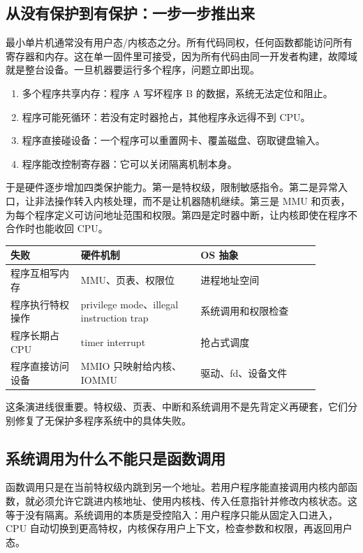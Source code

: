 \subsection{从没有保护到有保护：一步一步推出来}

最小单片机通常没有用户态/内核态之分。所有代码同权，任何函数都能访问所有寄存器和内存。这在单一固件里可接受，因为所有代码由同一开发者构建，故障域就是整台设备。一旦机器要运行多个程序，问题立即出现。

\begin{enumerate}
\tightlist
\item 多个程序共享内存：程序 A 写坏程序 B 的数据，系统无法定位和阻止。
\item 程序可能死循环：若没有定时器抢占，其他程序永远得不到 CPU。
\item 程序直接碰设备：一个程序可以重置网卡、覆盖磁盘、窃取键盘输入。
\item 程序能改控制寄存器：它可以关闭隔离机制本身。
\end{enumerate}

于是硬件逐步增加四类保护能力。第一是特权级，限制敏感指令。第二是异常入口，让非法操作转入内核处理，而不是让机器随机继续。第三是 MMU 和页表，为每个程序定义可访问地址范围和权限。第四是定时器中断，让内核即使在程序不合作时也能收回 CPU。

\begin{longtable}{p{0.2\linewidth}p{0.34\linewidth}p{0.34\linewidth}}
\toprule
失败 & 硬件机制 & OS 抽象 \\
\midrule
程序互相写内存 & MMU、页表、权限位 & 进程地址空间 \\
程序执行特权操作 & privilege mode、illegal instruction trap & 系统调用和权限检查 \\
程序长期占 CPU & timer interrupt & 抢占式调度 \\
程序直接访问设备 & MMIO 只映射给内核、IOMMU & 驱动、fd、设备文件 \\
\bottomrule
\end{longtable}

这条演进线很重要。特权级、页表、中断和系统调用不是先背定义再硬套，它们分别修复了无保护多程序系统中的具体失败。

\subsection{系统调用为什么不能只是函数调用}

函数调用只是在当前特权级内跳到另一个地址。若用户程序能直接调用内核内部函数，就必须允许它跳进内核地址、使用内核栈、传入任意指针并修改内核状态。这等于没有隔离。系统调用的本质是受控陷入：用户程序只能从固定入口进入，CPU 自动切换到更高特权，内核保存用户上下文，检查参数和权限，再返回用户态。

